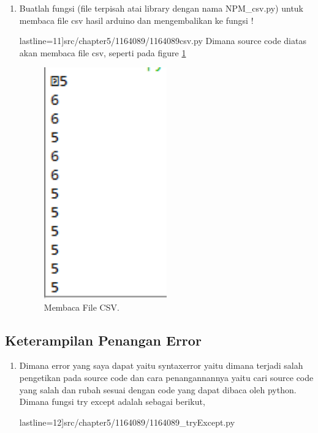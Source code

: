 \begin{enumerate}
\item Buatlah fungsi (file terpisah atai library dengan nama NPM\_csv.py) untuk membaca file csv hasil arduino dan mengembalikan ke fungsi !

	 lastline=11]{src/chapter5/1164089/1164089csv.py}
	\subitem Dimana source code diatas akan membaca file csv, seperti pada figure \ref{YNC5-12}

	\begin{figure}[!htbp]
		\centerline{\includegraphics[width=0.5\textwidth]{figures/chapter5/1164089/YNC5-12.png}}
		\caption{Membaca File CSV.}
		\label{YNC5-12}
	\end{figure} 

\end{enumerate}

\subsection{Keterampilan Penangan Error}
\begin{enumerate}

	\item Dimana error yang saya dapat yaitu syntaxerror yaitu dimana terjadi salah pengetikan pada source code dan cara penangannannya yaitu cari source code yang salah dan rubah sesuai dengan code yang dapat dibaca oleh python. Dimana fungsi try except adalah sebagai berikut,

	 lastline=12]{src/chapter5/1164089/1164089_tryExcept.py}
	
\end{enumerate}


